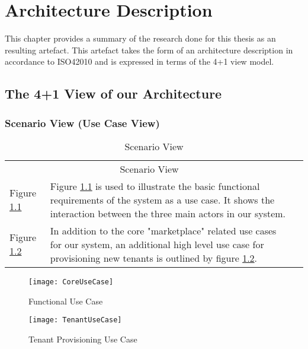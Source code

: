 \chapter{Architecture Description}
\label{chap:ad}
This chapter provides a summary of the research done for this thesis as an resulting artefact. This artefact takes the form of an architecture description in accordance to ISO42010 and is expressed in terms of the 4+1 view model.

\section{The 4+1 View of our Architecture}


\subsection{Scenario View (Use Case View)}

\begin{table}[h]
\centering
\begin{tabularx}{\textwidth}{lXl}
\cline{1-2}
\multicolumn{2}{|c|}{\cellcolor[HTML]{EFEFEF}Scenario View} &  \\ \cline{1-2}
\multicolumn{1}{|l|}{Figure \ref{fig:coreusecase}} & \multicolumn{1}{X|}{Figure \ref{fig:coreusecase} is used to illustrate the basic functional requirements of the system as a use case. It shows the interaction between the three main actors in our system.} &  \\ \cline{1-2}
\multicolumn{1}{|l|}{Figure \ref{fig:tenantusecase}} & \multicolumn{1}{X|}{In addition to the core "marketplace" related use cases for our system, an additional high level use case for provisioning new tenants is outlined by figure \ref{fig:tenantusecase}.} & \\
\cline{1-2}
\end{tabularx}
\caption{Scenario View}
\label{my-label}
\end{table}




\begin{figure}
\centering
\texttt{[image: CoreUseCase]}
\caption{Functional Use Case}
\label{fig:coreusecase}
\end{figure}


\begin{figure}
\centering
\texttt{[image: TenantUseCase]}
\caption{Tenant Provisioning Use Case}
\label{fig:tenantusecase}
\end{figure}

